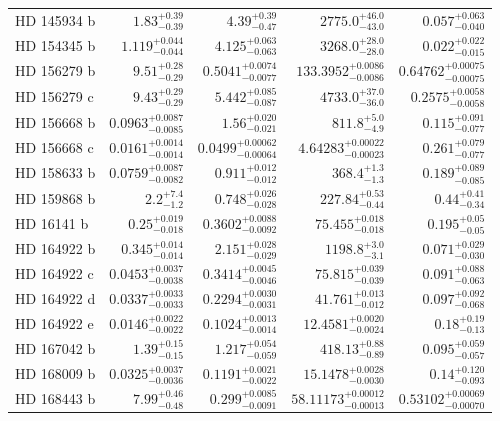 \begin{longtable*}{lrrrr}
HD 145934 b & $1.83^{+0.39}_{-0.39}$ & $4.39^{+0.39}_{-0.47}$ & $2775.0^{+46.0}_{-43.0}$ & $0.057^{+0.063}_{-0.040}$ \\ 
HD 154345 b & $1.119^{+0.044}_{-0.044}$ & $4.125^{+0.063}_{-0.063}$ & $3268.0^{+28.0}_{-28.0}$ & $0.022^{+0.022}_{-0.015}$ \\ 
HD 156279 b & $9.51^{+0.28}_{-0.29}$ & $0.5041^{+0.0074}_{-0.0077}$ & $133.3952^{+0.0086}_{-0.0086}$ & $0.64762^{+0.00075}_{-0.00075}$ \\ 
HD 156279 c & $9.43^{+0.29}_{-0.29}$ & $5.442^{+0.085}_{-0.087}$ & $4733.0^{+37.0}_{-36.0}$ & $0.2575^{+0.0058}_{-0.0058}$ \\ 
HD 156668 b & $0.0963^{+0.0087}_{-0.0085}$ & $1.56^{+0.020}_{-0.021}$ & $811.8^{+5.0}_{-4.9}$ & $0.115^{+0.091}_{-0.077}$ \\ 
HD 156668 c & $0.0161^{+0.0014}_{-0.0014}$ & $0.0499^{+0.00062}_{-0.00064}$ & $4.64283^{+0.00022}_{-0.00023}$ & $0.261^{+0.079}_{-0.077}$ \\ 
HD 158633 b & $0.0759^{+0.0087}_{-0.0082}$ & $0.911^{+0.012}_{-0.012}$ & $368.4^{+1.3}_{-1.3}$ & $0.189^{+0.089}_{-0.085}$ \\ 
HD 159868 b & $2.2^{+7.4}_{-1.2}$ & $0.748^{+0.026}_{-0.028}$ & $227.84^{+0.53}_{-0.44}$ & $0.44^{+0.41}_{-0.34}$ \\ 
HD 16141 b & $0.25^{+0.019}_{-0.018}$ & $0.3602^{+0.0088}_{-0.0092}$ & $75.455^{+0.018}_{-0.018}$ & $0.195^{+0.05}_{-0.05}$ \\ 
HD 164922 b & $0.345^{+0.014}_{-0.014}$ & $2.151^{+0.028}_{-0.029}$ & $1198.8^{+3.0}_{-3.1}$ & $0.071^{+0.029}_{-0.030}$ \\ 
HD 164922 c & $0.0453^{+0.0037}_{-0.0038}$ & $0.3414^{+0.0045}_{-0.0046}$ & $75.815^{+0.039}_{-0.039}$ & $0.091^{+0.088}_{-0.063}$ \\ 
HD 164922 d & $0.0337^{+0.0033}_{-0.0033}$ & $0.2294^{+0.0030}_{-0.0031}$ & $41.761^{+0.013}_{-0.012}$ & $0.097^{+0.092}_{-0.068}$ \\ 
HD 164922 e & $0.0146^{+0.0022}_{-0.0022}$ & $0.1024^{+0.0013}_{-0.0014}$ & $12.4581^{+0.0020}_{-0.0024}$ & $0.18^{+0.19}_{-0.13}$ \\ 
HD 167042 b & $1.39^{+0.15}_{-0.15}$ & $1.217^{+0.054}_{-0.059}$ & $418.13^{+0.88}_{-0.89}$ & $0.095^{+0.059}_{-0.057}$ \\ 
HD 168009 b & $0.0325^{+0.0037}_{-0.0036}$ & $0.1191^{+0.0021}_{-0.0022}$ & $15.1478^{+0.0028}_{-0.0030}$ & $0.14^{+0.120}_{-0.093}$ \\ 
HD 168443 b & $7.99^{+0.46}_{-0.48}$ & $0.299^{+0.0085}_{-0.0091}$ & $58.11173^{+0.00012}_{-0.00013}$ & $0.53102^{+0.00069}_{-0.00070}$ \\ 

\end{longtable*}
